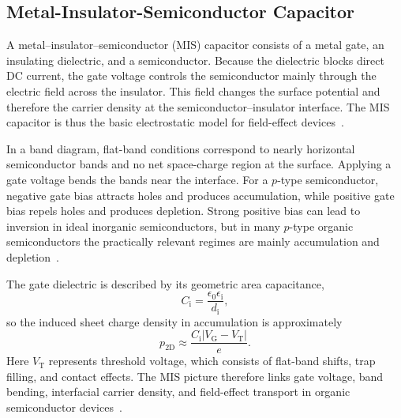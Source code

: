 \subsection{Metal-Insulator-Semiconductor Capacitor}

A metal--insulator--semiconductor (MIS) capacitor consists of a metal gate, an
insulating dielectric, and a semiconductor. Because the dielectric blocks direct
DC current, the gate voltage controls the semiconductor mainly through the
electric field across the insulator. This field changes the surface potential and
therefore the carrier density at the semiconductor--insulator interface. The MIS
capacitor is thus the basic electrostatic model for field-effect devices~\cite{Neamen,Hu2010MOSCapacitor}.

In a band diagram, flat-band conditions correspond to nearly horizontal
semiconductor bands and no net space-charge region at the surface. Applying a
gate voltage bends the bands near the interface. For a $p$-type semiconductor,
negative gate bias attracts holes and produces accumulation, while positive gate
bias repels holes and produces depletion. Strong positive bias can lead to
inversion in ideal inorganic semiconductors, but in many $p$-type organic
semiconductors the practically relevant regimes are mainly accumulation and
depletion~\cite{Manda2018OrganicMISCapacitor,Bruetting2005}.

The gate dielectric is described by its geometric area capacitance,
\begin{equation}
    C_\mathrm{i} = \frac{\epsilon_0 \epsilon_\mathrm{i}}{d_\mathrm{i}} ,
\end{equation}
so the induced sheet charge density in accumulation is approximately
\begin{equation}
    p_\text{2D} \approx \frac{C_\mathrm{i}|V_\mathrm{G}-V_\mathrm{T}|}{e}.
\end{equation}
Here $V_\mathrm{T}$ represents threshold voltage, which consists of  flat-band shifts, trap filling, and contact
effects. The MIS picture therefore links gate voltage, band bending, interfacial
carrier density, and field-effect transport in organic semiconductor devices~\cite{Hu2010MOSCapacitor,Manda2018OrganicMISCapacitor}.